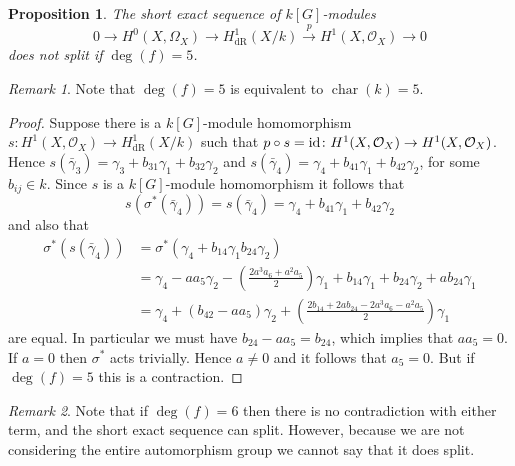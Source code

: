 \documentclass[draft, 11pt]{article} %
\theoremstyle{plain}
\newtheorem{prop}[defn]{Proposition}
\theoremstyle{remark}
\newtheorem*{rem}{Remark}
\newcommand{\ra}{\rightarrow}
\newcommand{\hzero}{{H^0(X,\Omega_X)}}
\newcommand{\hone}{H^1(X,\mathcal{O}_X)}
\newcommand{\derhamhone}{H_{\text {dR}}^1(X/k)}
\DeclareMathOperator{\cha}{char}
\begin{document}
\begin{prop}
The short exact sequence of $k[G]$-modules
\begin{equation*}
0 \ra \hzero \ra \derhamhone \xrightarrow{p} \hone \ra 0
\end{equation*}
does not split if $\deg(f) = 5$.
\end{prop}
\begin{rem}
Note that $\deg(f)=5$ is equivalent to $\cha(k)=5$.
\end{rem}
\begin{proof}
Suppose there is a $k[G]$-module homomorphism $s\colon \hone \ra \derhamhone$ such that $p \circ s  = {\rm id} \colon \hone \ra \hone$.
Hence $s(\bar \gamma_3) = \gamma_3 + b_{31} \gamma_1 + b_{32} \gamma_2$ and $s(\bar \gamma_4) = \gamma_4 + b_{41} \gamma_1 + b_{42} \gamma_2$, for some $ b_{ij} \in k$.
Since $s$ is a $k[G]$-module homomorphism it follows that
\[
s(\sigma^* ( \bar \gamma_4)) = s ( \bar \gamma_4) = \gamma_4 + b_{41}\gamma_1 + b_{42} \gamma_2
\]
and also that
\begin{align*}
\sigma^*(s(\bar \gamma_4))  & = \sigma^* (\gamma_4 + b_{14}\gamma_1 b_{24}\gamma_2 ) \\
& = \gamma_4 -aa_5\gamma_2 - \left( \frac{2a^3a_6+a^2a_5}{2} \right) \gamma_1 + b_{14}\gamma_1 + b_{24}\gamma_2 + ab_{24}\gamma_1 \\
& = \gamma_4 + (b_{42}-aa_5)\gamma_2 + \left( \frac{2b_{14}+2ab_{24}-2a^3a_6-a^2a_5}{2} \right) \gamma_1
\end{align*}
are equal.
In particular we must have $b_{24}-aa_5 = b_{24}$, which implies that $aa_5 =0$.
If $a=0$ then $\sigma^*$ acts trivially. 
Hence $a \neq 0$ and it follows that $a_5=0$.
But if $\deg(f) = 5$ this is a contraction.
\end{proof}
\begin{rem}
Note that if $\deg(f) = 6$ then there is no contradiction with either term, and the short exact sequence can split. 
However, because we are not considering the entire automorphism group we cannot say that it does split.
\end{rem}
\end{document}
